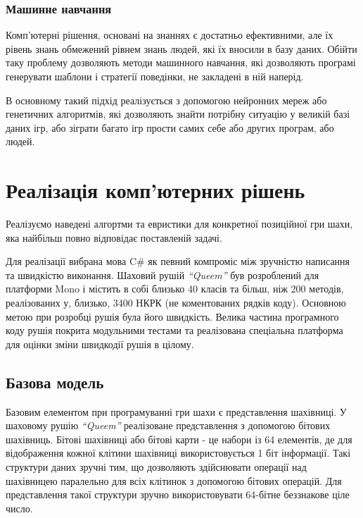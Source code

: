 \documentclass[12pt,a4paper]{article}
\begin{document}
\subsubsection{Машинне навчання}

Комп'ютерні рішення, основані на знаннях є достатньо ефективними, але їх
рівень знань обмежений рівнем знань людей, які їх вносили в базу даних. Обійти
таку проблему дозволяють методи машинного навчання, які дозволяють програмі
генерувати шаблони і стратегії поведінки, не закладені в ній наперід.

В основному такий підхід реалізується з допомогою нейронних мереж або
генетичних алгоритмів, які дозволяють знайти потрібну ситуацію у великій базі
даних ігр, або зіграти багато ігр прости самих себе або других програм, або людей.

\section{Реалізація комп'ютерних рішень}

Реалізуємо наведені алгортми та евристики для конкретної позиційної гри шахи,
яка найбільш повно відповідає поставленій задачі.

Для реалізації вибрана мова C\# як певний компроміс між зручністю написання та
швидкістю виконання. Шаховий рушій \textit{``Queem''} був розроблений для
платформи Mono і містить в собі близько 40 класів та більш, ніж 200 методів,
реалізованих у, близько, 3400 НКРК (не коментованих рядків коду). Основною
метою при розробці рушія була його швидкість. Велика частина програмного коду
рушія покрита модульними тестами та реалізована спеціальна платформа для
оцінки зміни швидкодії рушія в цілому.

\subsection{Базова модель}

Базовим елементом при програмуванні гри шахи є представлення шахівниці. У
шаховому рушію \textit{``Queem''} реалізоване представлення з допомогою
бітових шахівниць. Бітові шахівниці або бітові карти - це набори із 64
елементів, де для відображення кожної клітини шахівниці використовується 1
біт інформації. Такі структури даних зручні тим, що дозволяють здійснювати
операції над шахівницею паралельно для всіх клітинок з допомогою бітових
операцій. Для представлення такої структури зручно використовувати
64-бітне беззнакове ціле число.
\end{document}
